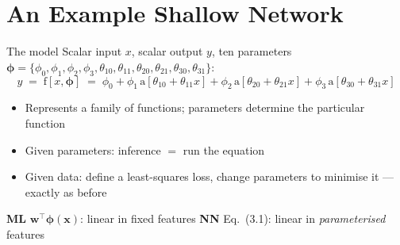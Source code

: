 \documentclass[aspectratio=169, 11pt]{beamer}
\newcommand{\mlparallel}[2]{%
  \vfill
  {\footnotesize
  \begin{tcolorbox}[enhanced, sidebyside, sidebyside align=top,
                    lefthand ratio=0.485,
                    segmentation style={mlc!35, line width=0.6pt},
                    colback=mlc!5, colframe=mlc!35, boxrule=0.5pt,
                    arc=1.5mm, left=2mm, right=2mm, top=0.8mm, bottom=0.8mm]
    {\color{mlc}\textbf{ML}}\;\; #1
  \tcblower
    {\color{nnc}\textbf{NN}}\;\; #2
  \end{tcolorbox}}%
  \vspace{0.6em}%
}
\begin{document}
\section{An Example Shallow Network}

\begin{frame}{The model}
  Scalar input $x$, scalar output $y$, ten parameters
  $\bm\phi = \{\phi_0,\phi_1,\phi_2,\phi_3,\theta_{10},
  \theta_{11},\theta_{20},\theta_{21},\theta_{30},\theta_{31}\}$:
  \[
    y \;=\; \mathrm{f}[x,\bm\phi]
    \;=\; \phi_0+\phi_1\,\mathrm{a}[\theta_{10}+\theta_{11}x]
    +\phi_2\,\mathrm{a}[\theta_{20}+\theta_{21}x]
    +\phi_3\,\mathrm{a}[\theta_{30}+\theta_{31}x]
    \tag{P 3.1}
  \]
  \vspace{-0.2em}
  \begin{itemize}\setlength{\itemsep}{1pt}
    \item Represents a \alert{family of functions};
          parameters determine the particular function
    \item Given parameters: inference $=$ run the equation
    \item Given data: define a least-squares loss, change
          parameters to minimise it --- exactly as before
  \end{itemize}
  \mlparallel{$\mathbf{w}^{\!\top}\boldsymbol{\phi}(\mathbf{x})$:
              linear in fixed features}
             {Eq.~(3.1): linear in \emph{parameterised}
              features}
\end{frame}
\end{document}
